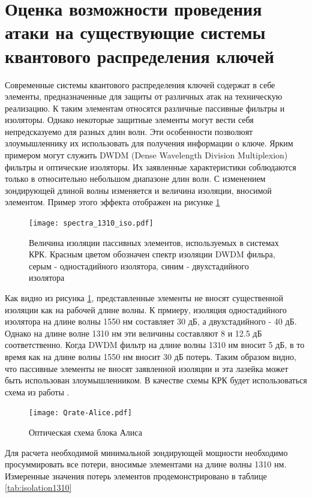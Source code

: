 \section{Оценка возможности проведения атаки на существующие системы квантового распределения ключей}\label{sec:ch4/sect6}
Современные системы квантового распределения ключей содержат в себе элементы, предназначенные для защиты от различных атак на техническую реализацию. К таким элементам относятся различные пассивные фильтры и изоляторы.
Однако некоторые защитные элементы могут вести себя непредсказуемо для разных длин волн. Эти особенности позволюят злоумышленнику их использовать для получения информации о ключе.
Ярким примером могут служить DWDM (Dense Wavelength Division Multiplexion) фильтры и оптические изоляторы. Их заявленные характеристики соблюдаются только в относительно небольшом диапазоне длин волн.
С изменением зондирующей длиной волны изменяется и величина изоляции, вносимой элементом. Пример этого эффекта отображен на рисунке \ref{fig:isolation_spectrums}
\begin{figure}
    \centering
    \texttt{[image: spectra\_1310\_iso.pdf]}
    \caption{Величина изоляции пассивных элементов, используемых в системах КРК. Красным цветом обозначен спектр изоляции DWDM фильра, серым - одностадийного изолятора, синим - двухстадийного изолятора}
    \label{fig:isolation_spectrums}
\end{figure}
Как видно из рисунка \ref{fig:isolation_spectrums}, представленные элементы не вносят существенной изоляции как на рабочей длине волны. К прмиеру, изоляция одностадийного изолятора на длине волны 1550 нм составляет 30 дБ, а двухстадийного - 40 дБ. Однако на длине волне 1310 нм эти величины составляют 8 и 12.5 дБ соответственно.
Когда DWDM фильтр на длине волны 1310 нм вносит 5 дБ, в то время как на длине волны 1550 нм вносит 30 дБ потерь. Таким образом видно, что пассивные элементы не вносят заявленной изоляции и эта лазейка может быть использован злоумышленником.
В качестве схемы КРК будет использоваться схема из работы \cite{makarov2023}. 
\begin{figure}
    \centering
    \texttt{[image: Qrate-Alice.pdf]}
    \caption*{Оптическая схема блока Алиса}
    \label{fig:Alice_qrate}
\end{figure}
Для расчета необходимой минимальной зондирующей мощности необходимо просуммировать все потери, вносимые элементами на длине волны 1310 нм. 
Измеренные значения потерь элементов продемонстрировано в таблице \ref{tab:isolation1310}
